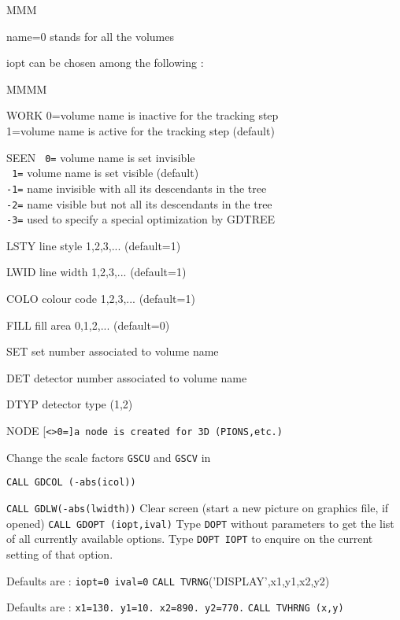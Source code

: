 \begin{DL}{MMM}
\item[name=0] stands for all the volumes
\item[iopt] can be chosen among the following :
\begin{DL}{MMMM}
\item[WORK]0=volume name is inactive for the tracking step\\
        1=volume name is active for the tracking step (default)
\item[SEEN]
       {\tt\ 0=} volume name is set invisible\\
       {\tt\ 1=} volume name is set visible (default) \\
       {\tt-1=}  name invisible with all its descendants in the tree\\
       {\tt-2=}  name visible but not all its descendants in the tree\\
       {\tt-3=}  used to specify a special optimization by GDTREE
\item[LSTY]   line style 1,2,3,... (default=1)
\item[LWID]   line width 1,2,3,... (default=1)
\item[COLO]   colour code 1,2,3,... (default=1)
\item[FILL]   fill area  0,1,2,... (default=0)
\item[SET ]   set number associated to volume name
\item[DET ]   detector number associated to volume name
\item[DTYP]   detector type (1,2)
\item[NODE]   [\tt<>0=]a node is created for 3D (PIONS,etc.)
\end{DL}
\end{DL}
Change the scale factors {\tt GSCU} and {\tt GSCV} in 
 
{\tt  CALL GDCOL (-abs(icol))}
 
{\tt  CALL GDLW(-abs(lwidth))}
Clear screen (start a new picture on graphics file, if opened)
{\tt  CALL GDOPT (iopt,ival)}
Type {\tt DOPT} without parameters to get the list of all currently
available options.
Type {\tt DOPT IOPT} to enquire on the current setting of that option.
 
Defaults are : {\tt iopt=0  ival=0}
{\tt  CALL TVRNG}('DISPLAY',x1,y1,x2,y2)
 
Defaults are : {\tt x1=130.  y1=10.  x2=890.  y2=770.}
{\tt  CALL TVHRNG (x,y)}
 
